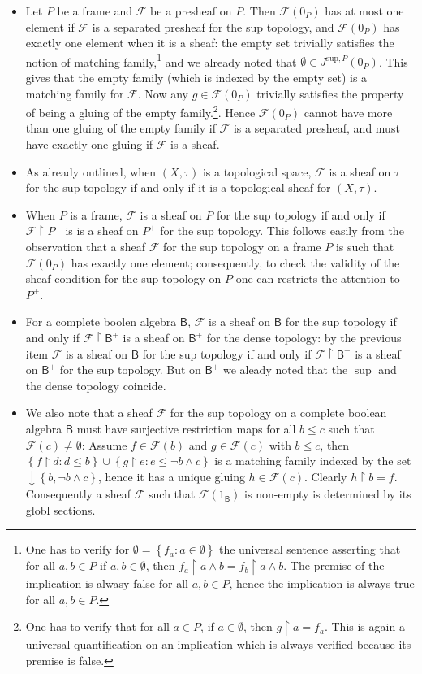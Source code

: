 \documentclass[11pt]{amsart}
\newcommand{\F}{\mathcal{F}}
\theoremstyle{plain}
\theoremstyle{definition}
\theoremstyle{plain}
\theoremstyle{remark}
\newcommand{\bool}[1]{\mathsf{#1}}
\newcommand{\bp}[1]{\left\lbrace #1 \right\rbrace}
\newcommand{\0}{\mathsf{0}}
\renewcommand{\1}{\mathsf{1}}
\renewcommand{\2}{\mathsf{2}}
\theoremstyle{definition}
\begin{document}
\begin{itemize}
\item
Let $P$ be a frame and
$\F$ be a presheaf on  $P$.  Then $\F(0_P)$ has at most one element if $\F$ is a separated presheaf for the sup topology, and $\F(0_P)$ has exactly one element when it is a sheaf: the empty set trivially satisfies the notion of matching family,\footnote{One has to verify for $\emptyset=\bp{f_a:a\in\emptyset}$ the universal sentence asserting that for all $a,b\in P$ if $a,b\in\emptyset$, then $f_a\restriction a \wedge b=f_b \restriction a\wedge b$. The premise of the implication is alwasy false for all $a,b\in P$, hence the implication is always true for all $a,b\in P$. } and we already noted that $\emptyset\in J^{\mathrm{sup},P}(0_P)$. This gives that the empty family (which is indexed by the empty set) is a matching family for $\F$. Now any $g\in \F(0_P)$ trivially satisfies the property of being a gluing of the empty family.\footnote{One has to verify that for all $a\in P$, if $a\in\emptyset$, then $g\restriction a=f_a$. This is again a universal quantification on  an implication which is always verified because its premise is false.}. Hence $\F(0_P)$ cannot have more than one gluing of the empty family if $\F$ is a separated presheaf, and must have exactly one gluing if $\F$ is a sheaf. 
\item
As already outlined, when $(X,\tau)$ is a topological space, $\F$ is a sheaf on $\tau$ for the
sup topology if and only if it is a topological sheaf for $(X,\tau)$.
\item When $P$ is a frame, $\F$ is a sheaf on $P$ for the sup topology if and only if $\F\restriction P^+$ is is a sheaf on $P^+$ for the sup topology. This follows easily from the observation that a sheaf $\F$ for the sup topology on a frame $P$ is such that $\F(0_P)$ has exactly one element; consequently, to check the validity of the sheaf condition for the sup topology on $P$ one can restricts the attention to $P^+$.
\item For a complete boolen algebra $\bool{B}$, $\F$ is a sheaf on $\bool{B}$ for the sup topology if and only if $\F\restriction \bool{B}^+$ is a sheaf on $\bool{B}^+$ for the dense topology: by the previous item $\F$ is a sheaf on $\bool{B}$ for the sup topology if and only if $\F\restriction \bool{B}^+$ is a sheaf on $\bool{B}^+$ for the sup topology. But on 
$\bool{B}^+$ we aleady noted that the $\sup$ and the dense topology coincide.
\item We also note that a sheaf $\F$ for the sup topology on a complete boolean algebra $\bool{B}$ must have surjective restriction maps for all $b\leq c$ such that $\F(c)\neq\emptyset$: Assume $f\in \F(b)$ and $g\in\F(c)$ with $b\leq c$, then $\bp{f\restriction d:d\leq b}\cup\bp{g\restriction e: e\leq\neg b\wedge c}$ is a matching family indexed by the set $\downarrow\bp{b,\neg b\wedge c}$, hence it has a unique gluing $h\in\F(c)$. Clearly $h\restriction b=f$. Consequently a sheaf $\F$ such that $\F(1_\bool{B})$ is non-empty is determined by its globl sections.
\end{itemize}
\end{document}
